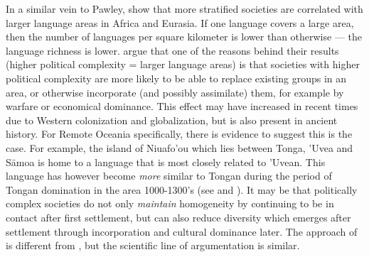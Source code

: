 \documentclass[unnumsec,webpdf,modern,medium]{oup-authoring-template}
\begin{document}
In a similar vein to Pawley, \citet{curriemace2009} show that more stratified societies are correlated with larger language areas in Africa and Eurasia. If one language covers a large area, then the number of languages per square kilometer is lower than otherwise --- the language richness is lower. \citet{curriemace2009} argue that one of the reasons behind their results (higher political complexity = larger language areas) is that societies with higher political complexity are more likely to be able to replace existing groups in an area, or otherwise incorporate (and possibly assimilate) them, for example by warfare or economical dominance. This effect may have increased in recent times due to Western colonization and globalization, but is also present in ancient history. For Remote Oceania specifically, there is evidence to suggest this is the case. For example, the island of Niuafo'ou which lies between Tonga, 'Uvea and S\={a}moa is home to a language that is most closely related to 'Uvean. This language has however become \emph{more} similar to Tongan during the period of Tongan domination in the area 1000-1300's (see \citet{aswani1998tongan} and \citep[2-9]{tuskamoto_niuafoou}). It may be that politically complex societies do not only \emph{maintain} homogeneity by continuing to be in contact after first settlement, but can also reduce diversity which emerges after settlement through incorporation and cultural dominance later. The approach of \citet{curriemace2009} is different from \citet{pawley81, pawley2007}, but the scientific line of argumentation is similar.
\end{document}
